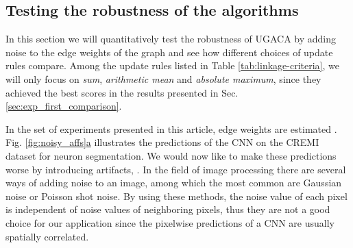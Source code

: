\subsection{Testing the robustness of the algorithms}
 In this section we will quantitatively test the robustness of UGACA by adding noise to the edge weights of the graph and see how different choices of update rules compare.
 Among the update rules listed in Table \ref{tab:linkage-criteria}, we will only focus on \emph{sum}, \emph{arithmetic mean} and \emph{absolute maximum}, since they achieved the best scores in the results presented in Sec. \ref{sec:exp_first_comparison}. %

 In the set of experiments presented in this article, edge weights are estimated . Fig. \hyperref[fig:noisy_affs]{\ref*{fig:noisy_affs}a} illustrates the predictions of the CNN on the CREMI dataset for neuron segmentation. We would now like to make these predictions worse by introducing  artifacts, . In the field of image processing there are several ways of adding noise to an image, among which the most common are Gaussian noise or Poisson shot noise. By using these methods, the noise value of each pixel is independent of noise values of neighboring pixels, thus they are not a good choice for our application since the pixelwise predictions of a CNN are usually spatially correlated. 

